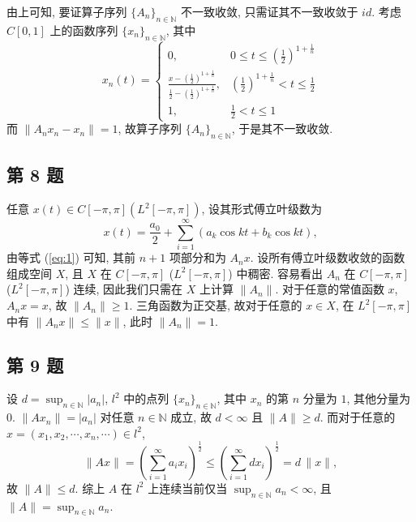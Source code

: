 \documentclass[../main.tex]{subfiles}
\begin{document}
由上可知, 要证算子序列 $\{ A_{n} \}_{n \in \mathbb{N}}$ 不一致收敛, 只需证其不一致收敛于 $id$.
考虑 $C[0, 1]$ 上的函数序列 $\{ x_{n} \}_{n \in \mathbb{N}}$, 其中
\[
    x_n(t) = \begin{cases}
        0, & 0 \leqslant t \leqslant \left( \frac{1}{2} \right)^{1 + \frac{1}{n}} \\
        \frac{x - \left( \frac{1}{2} \right)^{1 + \frac{1}{n}}}{\frac{1}{2} - \left( \frac{1}{2} \right)^{1 + \frac{1}{n}}}, & \left( \frac{1}{2} \right)^{1 + \frac{1}{n}} < t \leqslant \frac{1}{2} \\
        1, & \frac{1}{2} < t \leqslant 1
    \end{cases}
\]
而 $\| A_n x_n - x_n \| = 1$, 故算子序列 $\{ A_{n} \}_{n \in \mathbb{N}}$, 于是其不一致收敛.

\subsection{第 8 题}
任意 $x(t) \in C[-\pi, \pi] (L^2[-\pi, \pi])$, 设其形式傅立叶级数为
\[
    x(t) = \frac{a_0}{2} + \sum_{i = 1}^{\infty}(a_k \cos{kt} + b_k \cos{kt}),
\]
由等式 (\ref{eq:1}) 可知, 其前 $n + 1$ 项部分和为 $A_n x$.
设所有傅立叶级数收敛的函数组成空间 $X$, 且 $X$ 在 $C[-\pi, \pi]$ ($L^2[-\pi, \pi]$) 中稠密.
容易看出 $A_n$ 在 $C[-\pi, \pi]$ ($L^2[-\pi, \pi]$) 连续, 因此我们只需在 $X$ 上计算 $\| A_n \|$.
对于任意的常值函数 $x$, $A_n x = x$, 故 $\| A_n \| \geqslant 1$.
三角函数为正交基, 故对于任意的 $x \in X$,
在 $L^2[-\pi, \pi]$ 中有 $\| A_n x \| \leqslant \| x \|$, 此时 $\| A_n \| = 1$.

\subsection{第 9 题}
设 $d = \sup_{n \in \mathbb{N}} | a_n |$,
$l^2$ 中的点列 $\{ x_n \}_{n \in \mathbb{N}}$, 其中 $x_n$ 的第 $n$ 分量为 $1$, 其他分量为 $0$.
$\| A x_n \| = | a_n |$ 对任意 $n \in \mathbb{N}$ 成立,
故 $d < \infty$ 且 $\| A \| \geqslant d$.
而对于任意的 $x = (x_1, x_2, \cdots, x_n, \cdots)\in l^2$,
\[
    \| A x \| = \left( \sum_{i = 1}^{\infty} a_i x_i \right)^{\frac{1}{2}}
    \leqslant \left( \sum_{i = 1}^{\infty} d x_i \right)^{\frac{1}{2}}
    = d \, \| x \|,
\]
故 $\| A \| \leqslant d$.
综上 $A$ 在 $l^2$ 上连续当前仅当 $\sup_{n \in \mathbb{N}} a_n < \infty$,
且 $\| A \| = \sup_{n \in \mathbb{N}} a_n$.
\end{document}

